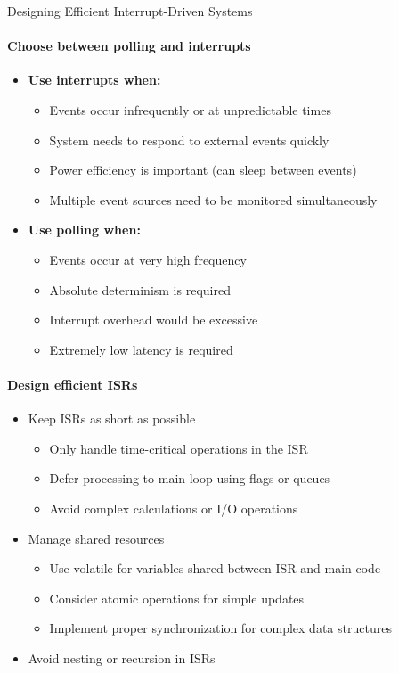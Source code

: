 \begin{KR}{Designing Efficient Interrupt-Driven Systems}\\
\paragraph{Choose between polling and interrupts}
\begin{itemize}
    \item \textbf{Use interrupts when:}
    \begin{itemize}
        \item Events occur infrequently or at unpredictable times
        \item System needs to respond to external events quickly
        \item Power efficiency is important (can sleep between events)
        \item Multiple event sources need to be monitored simultaneously
    \end{itemize}
    \item \textbf{Use polling when:}
    \begin{itemize}
        \item Events occur at very high frequency
        \item Absolute determinism is required
        \item Interrupt overhead would be excessive
        \item Extremely low latency is required
    \end{itemize}
\end{itemize}

\paragraph{Design efficient ISRs}
\begin{itemize}
    \item Keep ISRs as short as possible
    \begin{itemize}
        \item Only handle time-critical operations in the ISR
        \item Defer processing to main loop using flags or queues
        \item Avoid complex calculations or I/O operations
    \end{itemize}
    \item Manage shared resources
    \begin{itemize}
        \item Use volatile for variables shared between ISR and main code
        \item Consider atomic operations for simple updates
        \item Implement proper synchronization for complex data structures
    \end{itemize}
    \item Avoid nesting or recursion in ISRs
\end{itemize}


\end{KR}
